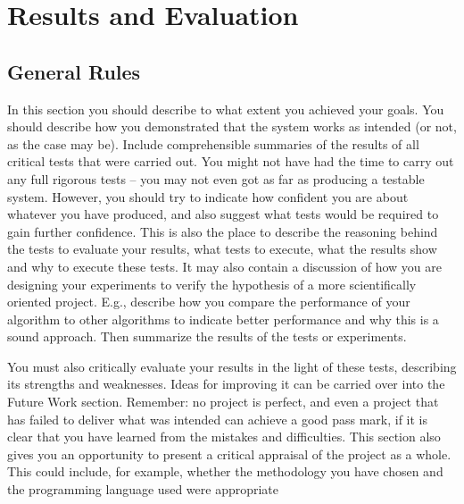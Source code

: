 \chapter{Results and Evaluation}



\section{General Rules}
In this section you should describe to what extent you achieved your goals.
You should describe how you demonstrated that the system works as intended (or not, as the
case may be). Include comprehensible summaries of the results of all critical tests that were
carried out. You might not have had the time to carry out any full rigorous tests – you may
not even got as far as producing a testable system. However, you should try to indicate how
confident you are about whatever you have produced, and also suggest what tests would be
required to gain further confidence.
This is also the place to describe the reasoning behind the tests to evaluate your results, what
tests to execute, what the results show and why to execute these tests. It may also contain a
discussion of how you are designing your experiments to verify the hypothesis of a more
scientifically oriented project. E.g., describe how you compare the performance of your
algorithm to other algorithms to indicate better performance and why this is a sound
approach. Then summarize the results of the tests or experiments.

You must also critically evaluate your results in the light of these tests, describing its
strengths and weaknesses. Ideas for improving it can be carried over into the Future Work
section. Remember: no project is perfect, and even a project that has failed to deliver what
was intended can achieve a good pass mark, if it is clear that you have learned from the
mistakes and difficulties.
This section also gives you an opportunity to present a critical appraisal of the project as a
whole. This could include, for example, whether the methodology you have chosen and the
programming language used were appropriate


